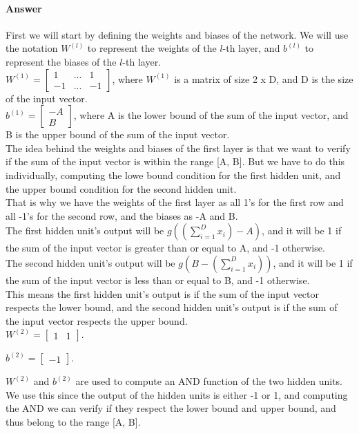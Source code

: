 \documentclass{article}
\begin{document}
\paragraph{Answer}

First we will start by defining the weights and biases of the network. We will use the notation
\( W^{(l)} \) to represent the weights of the \( l \)-th layer, and \( b^{(l)} \) to represent the biases of the \( l \)-th layer. \\

\( W^{(1)} = \begin{bmatrix}
    1 & ... & 1\\
    -1 & ...  & -1
\end{bmatrix}
\), where \(W^{(1)}\) is a matrix of size 2 x D, and D is the size of the input vector. \\

\(b^{(1)} = \begin{bmatrix}
    -A\\
    B
\end{bmatrix}
\), where A is the lower bound of the sum of the input vector, and B is the upper bound of the sum of the input vector. \\

The idea behind the weights and biases of the first layer is that we want to verify if the sum of the input vector is within the range [A, B].
But we have to do this individually, computing the lowe bound condition for the first hidden unit, 
and the upper bound condition for the second hidden unit. \\

That is why we have the weights of the first layer as all 1's for the first row and all -1's for the second row, and the biases as -A and B. \\
The first hidden unit's output will be $g((\sum_{i=1}^{D} x_i) - A)$, and it will be 1 if the sum of the input vector is greater than or equal to A, 
and -1 otherwise. \\
The second hidden unit's output will be $g(B - (\sum_{i=1}^{D} x_i))$, and it will be 1 if the sum of the input vector is less than or equal to B, 
and -1 otherwise. \\
This means the first hidden unit's output is if the sum of the input vector respects the lower bound, 
and the second hidden unit's output is if the sum of the input vector respects the upper bound. \\

\( W^{(2)} = \begin{bmatrix}
    1 & 1
\end{bmatrix}
\).

\(b^{(2)} = \begin{bmatrix}
    -1
\end{bmatrix}
\).

\(W^{(2)}\) and \(b^{(2)}\) are used to compute an AND function of the two hidden units. We use this since the output of 
the hidden units is either -1 or 1, and computing the AND we can verify if they respect the lower bound and upper bound, and thus
belong to the range [A, B]. \\
\end{document}
